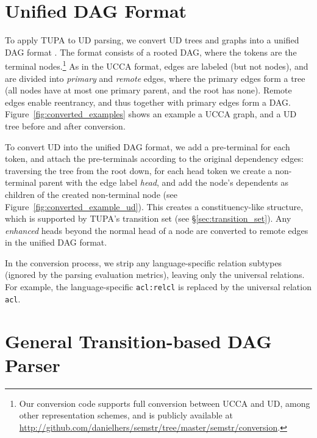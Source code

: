 \documentclass[11pt,a4paper]{article}
\begin{document}
\section{Unified DAG Format}\label{sec:format}

To apply TUPA to UD parsing,
we convert UD trees and graphs into a unified DAG format \cite{hershcovich2018multitask}.
The format consists of a rooted DAG, where the tokens are the terminal
nodes.\footnote{Our conversion code supports full conversion between UCCA and UD,
among other representation schemes,
and is publicly available at \url{http://github.com/danielhers/semstr/tree/master/semstr/conversion}.}
As in the UCCA format, edges are labeled (but not nodes),
and are divided into \textit{primary} and \textit{remote} edges,
where the primary edges form a tree (all nodes have at most one primary parent,
and the root has none).
Remote edges enable reentrancy, and thus together with primary edges
form a DAG.
Figure~\ref{fig:converted_examples} shows an example a UCCA graph,
and a UD tree before and after conversion.

To convert UD into the unified DAG format,
we add a pre-terminal for each token,
and attach the pre-terminals according to the original dependency edges:
traversing the tree from the root down, for each head token we create a non-terminal
parent with the edge label {\it head},
and add the node's dependents as children of the created non-terminal node
(see Figure~\ref{fig:converted_example_ud}).
This creates a constituency-like structure,
which is supported by TUPA's transition set (see \S\ref{sec:transition_set}).
Any \textit{enhanced}
heads beyond the normal head of a node are converted to remote edges in the unified DAG format.

In the conversion process, we strip any language-specific relation subtypes
(ignored by the parsing evaluation metrics),
leaving only the universal relations.
For example, the language-specific \verb|acl:relcl| is replaced by the universal relation \verb|acl|.


\section{General Transition-based DAG Parser}\label{sec:model}
\end{document}
